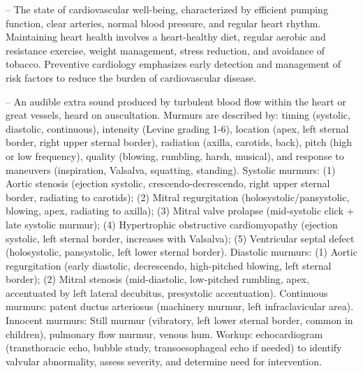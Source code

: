 -- The state of cardiovascular well-being, characterized by efficient pumping function, clear arteries, normal blood pressure, and regular heart rhythm. Maintaining heart health involves a heart-healthy diet, regular aerobic and resistance exercise, weight management, stress reduction, and avoidance of tobacco. Preventive cardiology emphasizes early detection and management of risk factors to reduce the burden of cardiovascular disease.

-- An audible extra sound produced by turbulent blood flow within the heart or great vessels, heard on auscultation. Murmurs are described by: timing (systolic, diastolic, continuous), intensity (Levine grading 1-6), location (apex, left sternal border, right upper sternal border), radiation (axilla, carotids, back), pitch (high or low frequency), quality (blowing, rumbling, harsh, musical), and response to maneuvers (inspiration, Valsalva, squatting, standing). Systolic murmurs: (1) Aortic stenosis (ejection systolic, crescendo-decrescendo, right upper sternal border, radiating to carotids); (2) Mitral regurgitation (holosystolic/pansystolic, blowing, apex, radiating to axilla); (3) Mitral valve prolapse (mid-systolic click + late systolic murmur); (4) Hypertrophic obstructive cardiomyopathy (ejection systolic, left sternal border, increases with Valsalva); (5) Ventricular septal defect (holosystolic, pansystolic, left lower sternal border). Diastolic murmurs: (1) Aortic regurgitation (early diastolic, decrescendo, high-pitched blowing, left sternal border); (2) Mitral stenosis (mid-diastolic, low-pitched rumbling, apex, accentuated by left lateral decubitus, presystolic accentuation). Continuous murmurs: patent ductus arteriosus (machinery murmur, left infraclavicular area). Innocent murmurs: Still murmur (vibratory, left lower sternal border, common in children), pulmonary flow murmur, venous hum. Workup: echocardiogram (transthoracic echo, bubble study, transoesophageal echo if needed) to identify valvular abnormality, assess severity, and determine need for intervention.

